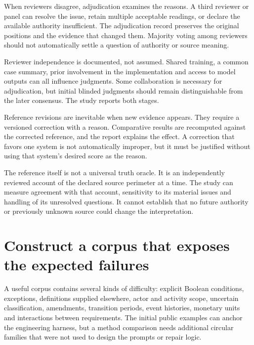 
When reviewers disagree, adjudication examines the reasons. A third reviewer or
panel can resolve the issue, retain multiple acceptable readings, or declare the
available authority insufficient. The adjudication record preserves the original
positions and the evidence that changed them. Majority voting among reviewers
should not automatically settle a question of authority or source meaning.

Reviewer independence is documented, not assumed. Shared training, a common case
summary, prior involvement in the implementation and access to model outputs can
all influence judgments. Some collaboration is necessary for adjudication, but
initial blinded judgments should remain distinguishable from the later consensus.
The study reports both stages.

Reference revisions are inevitable when new evidence appears. They require a
versioned correction with a reason. Comparative results are recomputed against
the corrected reference, and the report explains the effect. A correction that
favors one system is not automatically improper, but it must be justified without
using that system's desired score as the reason.

The reference itself is not a universal truth oracle. It is an independently
reviewed account of the declared source perimeter at a time. The study can measure
agreement with that account, sensitivity to its material issues and handling of
its unresolved questions. It cannot establish that no future authority or
previously unknown source could change the interpretation.

\section{Construct a corpus that exposes the expected failures}
\label{merge:M09:03}


A useful corpus contains several kinds of difficulty: explicit Boolean conditions,
exceptions, definitions supplied elsewhere, actor and activity scope, uncertain
classification, amendments, transition periods, event histories, monetary units
and interactions between requirements. The initial public examples can anchor the
engineering harness, but a method comparison needs additional circular families
that were not used to design the prompts or repair logic.


